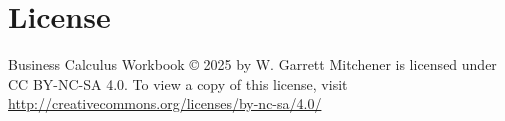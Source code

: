 \section*{License}

Business Calculus Workbook \copyright{} 2025 by W. Garrett Mitchener is licensed under CC BY-NC-SA 4.0. To view a copy of this license, visit \url{http://creativecommons.org/licenses/by-nc-sa/4.0/}


